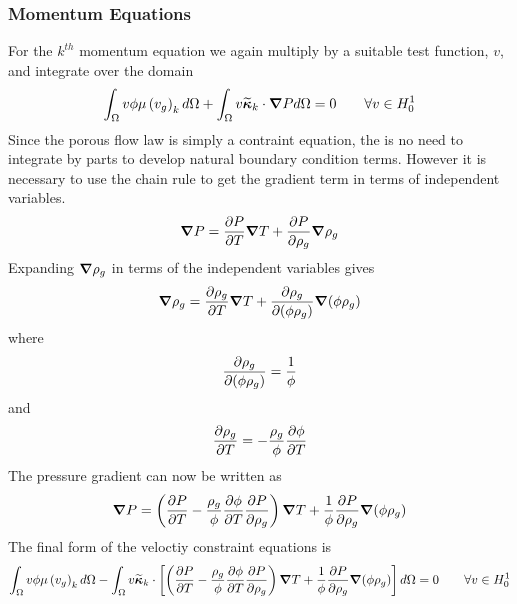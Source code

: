 \subsubsection{Momentum Equations}
For the $k^{th}$ momentum equation we again multiply by a suitable test function, $v$, and integrate over the domain
\begin{equation}
  \int_{\Omega} v \phi\mu\left(v_{g}\right)_{k} d \Omega + \int_{\Omega} v \widetilde{\boldsymbol{\kappa}}_{k} \cdot \grad{P} d \Omega = 0 \hspace{2eM} \forall v \in H_0^1
\end{equation} 
Since the porous flow law is simply a contraint equation, the is no need to integrate by parts to develop natural boundary condition terms.  However it is necessary to use the chain rule to get the gradient term in terms of independent variables.
\begin{equation}
  {\boldsymbol{\nabla}} {P} = {\frac{\partial{P}}{\partial{T}}} {\boldsymbol{\nabla}} {T} + {\frac{\partial{P}}{\partial{\rho_g}}} {\boldsymbol{\nabla}} {\rho_g}
\end{equation}
Expanding ${\boldsymbol{\nabla}} {\rho}_g$ in terms of the independent variables gives
\begin{equation}
  {\boldsymbol{\nabla}} {\rho}_g = {\frac{\partial{\rho_g}}{\partial{T}}} {\boldsymbol{\nabla}} {T} + {\frac{\partial{\rho_g}}{\partial{\left(\phi \rho_g\right)}}} {\boldsymbol{\nabla}} {\left(\phi\rho_g\right)}
\end{equation}
where
\begin{equation}
  {\frac{\partial{\rho_{g}}}{\partial{\left(\phi\rho_{g}\right)}}} = \frac{1}{\phi}
\end{equation}
and
\begin{equation}
  {\frac{\partial{\rho_{g}}}{\partial{T}}} = -\frac{\rho_{g}}{\phi}{\frac{\partial{\phi}}{\partial{T}}}
\end{equation}
The pressure gradient can now be written as
\begin{equation}
  {\boldsymbol{\nabla}} {P} = \left({\frac{\partial{P}}{\partial{T}}} - \frac{\rho_{g}}{\phi} {\frac{\partial{\phi}}{\partial{T}}} {\frac{\partial{P}}{\partial{\rho_g}}}  \right) {\boldsymbol{\nabla}} {T}  + \frac{1}{\phi} {\frac{\partial{P}}{\partial{\rho_{g}}}} {\boldsymbol{\nabla}} {\left(\phi\rho_{g}\right)}
\end{equation}
The final form of the veloctiy constraint equations is
\begin{equation}
  \int_{\Omega} v \phi\mu\left(v_{g}\right)_{k} d \Omega - \int_{\Omega} v \widetilde{\boldsymbol{\kappa}}_{k} \cdot \left[ \left(\pdv{P}{T} - \frac{\rho_{g}}{\phi} \pdv{\phi}{T} \pdv{P}{\rho_g}  \right) \grad T  + \frac{1}{\phi} \pdv{P}{\rho_{g}} \grad{\left(\phi\rho_{g}\right)} \right] d \Omega = 0 \hspace{2eM} \forall v \in H_0^1
\label{eq:pde_abl_momentum_galerkin}
\end{equation} 

